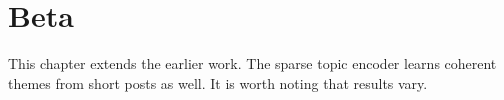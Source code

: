 \chapter{Beta}
This chapter extends the earlier work. The sparse topic encoder learns coherent
themes from short posts as well. It is worth noting that results vary.
